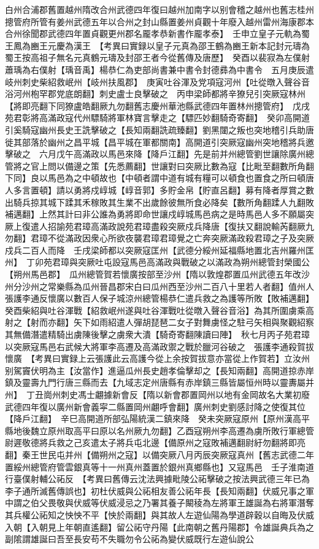 白州合浦郡舊置越州隋改合州武德四年復曰越州加南字以别會稽之越州也舊志桂州摠管府所管有姜州武德五年以合州之封山縣置姜州貞觀十年廢入越州雷州海康郡本合州徐聞郡武德四年置貞觀更州郡名龎孝恭新書作龎孝泰】　壬申立皇子元軌為蜀王鳳為豳王元慶為漢王　【考異曰實録以皇子元真為邵王鶴為豳王新本記封元璹為蜀王按高祖子無名元真鶴元璹及封邵王者今從舊傳及唐歷】　癸酉以裴寂為左僕射蕭瑀為右僕射【瑀音禹】楊恭仁為吏部尚書兼中書令封德彞為中書令　五月庚辰遣岐州刺史柴紹救岷州【岐州扶風郡】　庚寅吐谷渾及党項寇河州【吐從暾入聲谷音浴河州枹罕郡党底朗翻】刺史盧士良擊破之　丙申梁師都將辛獠兒引突厥寇林州【將即亮翻下同獠盧皓翻厥九勿翻舊志慶州華池縣武德四年置林州摠管府】　戊戌苑君彰將高滿政寇代州驃騎將軍林寶言擊走之【驃匹妙翻騎奇寄翻】　癸卯高開道引奚騎寇幽州長史王詵擊破之【長知兩翻詵疏臻翻】劉黑闥之叛也突地稽引兵助唐徙其部落於幽州之昌平城【昌平城在軍都關南】高開道引突厥寇幽州突地稽將兵邀擊破之　六月戊午高滿政以馬邑來降【降戶江翻】先是前并州總管劉世讓除廣州總管將之官上問以備邊之策【先悉薦翻】世讓對曰突厥比數為寇【比毗至翻數所角翻下同】良以馬邑為之中頓故也【中頓者謂中道有城有糧可以頓食也置食之所曰頓唐人多言置頓】請以勇將戍崞城【崞音郭】多貯金帛【貯直呂翻】募有降者厚賞之數出騎兵掠其城下蹂其禾稼敗其生業不出歲餘彼無所食必降矣【數所角翻蹂人九翻敗補邁翻】上然其計曰非公誰為勇將即命世讓戍崞城馬邑病之是時馬邑人多不願屬突厥上復遣人招諭苑君璋高滿政說苑君璋盡殺突厥戍兵降唐【復扶又翻說輸芮翻厥九勿翻】君璋不從滿政因衆心所欲夜襲君璋君璋覺之亡奔突厥滿政殺君璋之子及突厥戍兵二百人而降　壬戌梁師都以突厥寇匡州【武德分綏州延福縣地置北吉州羅州匡州】　丁卯苑君璋與突厥吐屯設寇馬邑高滿政與戰破之以滿政為朔州總管封榮國公【朔州馬邑郡】　瓜州總管賀若懷廣按部至沙州【隋以敦煌郡置瓜州武德五年改沙州分沙州之常樂縣為瓜州晉昌郡宋白曰瓜州西至沙州二百八十里若人者翻】值州人張護李通反懷廣以數百人保子城涼州總管楊恭仁遣兵救之為護等所敗【敗補邁翻】　癸酉柴紹與吐谷渾戰【紹救岷州遂與吐谷渾戰吐從暾入聲谷音浴】為其所圍虜乘高射之【射而亦翻】矢下如雨紹遣人彈胡琵琶二女子對舞虜怪之駐弓矢相與聚觀紹察其無備潛遣精騎出虜陳後擊之虜衆大潰【騎奇寄翻陳讀曰陣】　秋七月丙子苑君璋以突厥寇馬邑右武候大將軍李高遷及高滿政禦之戰於臘河谷破之　張護李通殺賀拔懷廣　【考異曰實録上云張護此云高護今從上余按賀拔意亦當從上作賀若】立汝州别駕竇伏明為主【汝當作】進逼瓜州長史趙孝倫擊却之【長知兩翻】高開道掠赤岸鎮及靈壽九門行唐三縣而去【九域志定州唐縣有赤岸鎮三縣皆屬恒州時以靈夀屬并州】　丁丑崗州刺史馮士翽據新會反【隋以新會郡置岡州以地有金岡故名大業初廢武德四年復以廣州新會義寜二縣置岡州翽呼會翻】廣州刺史劉感討降之使復其位【降戶江翻】　辛巳高開道所部弘陽統漢二鎮來降　癸未突厥寇原州【原州漢高平縣地後魏立原州取高平曰原以名州厥九勿翻】乙酉寇朔州李高遷為虜所敗行軍總管尉遲敬德將兵救之己亥遣太子將兵屯北邊【備原州之寇敗補邁翻尉紆勿翻將即亮翻】秦王世民屯并州【備朔州之寇】以備突厥八月丙辰突厥寇真州【舊志武德二年置綏州總管府管雲銀真等十一州真州蓋置於銀州真鄉縣也】又寇馬邑　壬子淮南道行臺僕射輔公祏反　【考異曰舊傳云沈法興據毗陵公祏擊破之按法興武德三年已為李子通所滅舊傳誤也】初杜伏威與公祏相友善公祏年長【長知兩翻】伏威兄事之軍中謂之伯父畏敬與伏威等伏威浸忌之乃署其養子闞稜為左將軍王雄誕為右將軍潛奪其兵權公祏知之怏怏不平【怏於兩翻】與其故人左遊仙陽為學道辟穀以自晦及伏威入朝【入朝見上年朝直遙翻】留公祏守丹陽【此南朝之舊丹陽郡】令雄誕典兵為之副隂謂雄誕曰吾至長安苟不失職勿令公祏為變伏威既行左遊仙說公